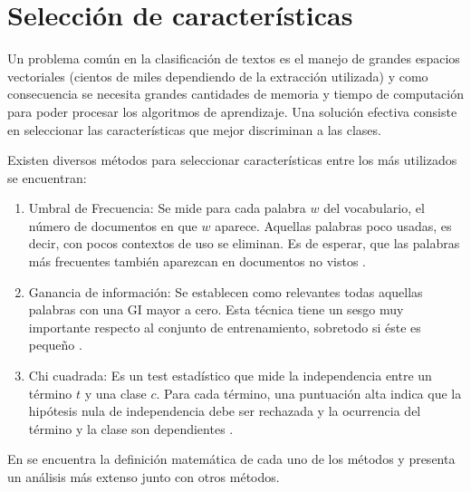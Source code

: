 \section{Selección de características}

Un problema común en la clasificación de textos es el manejo de grandes espacios vectoriales (cientos de miles dependiendo de la extracción utilizada) y como consecuencia se necesita grandes cantidades de memoria y tiempo de computación para poder procesar los algoritmos de aprendizaje. Una solución efectiva consiste en seleccionar las características que mejor discriminan a las clases.

Existen diversos métodos para seleccionar características entre los más utilizados se encuentran:

\begin{enumerate}
    \item Umbral de Frecuencia: Se mide para cada palabra $w$ del vocabulario, el número de documentos en que $w$ aparece. Aquellas palabras poco usadas, es decir, con pocos contextos de uso se eliminan. Es de esperar, que las palabras más frecuentes también aparezcan en documentos no vistos \citep{yang1997comparative}.
    
    \item Ganancia de información: Se establecen como relevantes todas aquellas palabras con una GI mayor a cero. Esta técnica tiene un sesgo muy importante respecto al conjunto de entrenamiento, sobretodo si éste es pequeño \citep{yang1997comparative}.   
    \item Chi cuadrada: Es un test estadístico que mide la independencia entre un término $t$ y una clase $c$. Para cada término, una puntuación alta indica que la hipótesis nula de independencia debe ser rechazada y la ocurrencia del término y la clase son dependientes \citep{yang1997comparative}.
\end{enumerate}

En \citep{yang1997comparative} se encuentra la definición matemática de cada uno de los métodos y \citep{forman2003extensive} presenta un análisis más extenso junto con otros métodos. 
